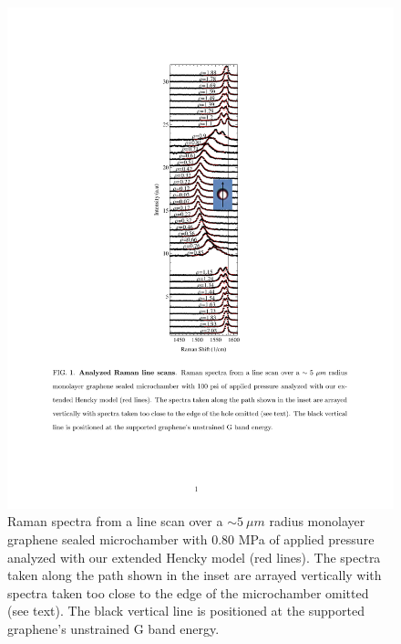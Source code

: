 \begin{figure}
\begin{center}
\includegraphics{Figs_Friction/Figure_4.pdf}
\end{center}
\caption{\label{fitlinescan} Raman spectra from a line scan over a $\sim 5 \ \mu m$ radius monolayer graphene sealed microchamber with 0.80 MPa of applied pressure analyzed with our extended Hencky model (red lines).  The spectra taken along the path shown in the inset are arrayed vertically with spectra taken too close to the edge of the microchamber omitted (see text).  The black vertical line is positioned at the supported graphene's unstrained G band energy.}
\end{figure}

